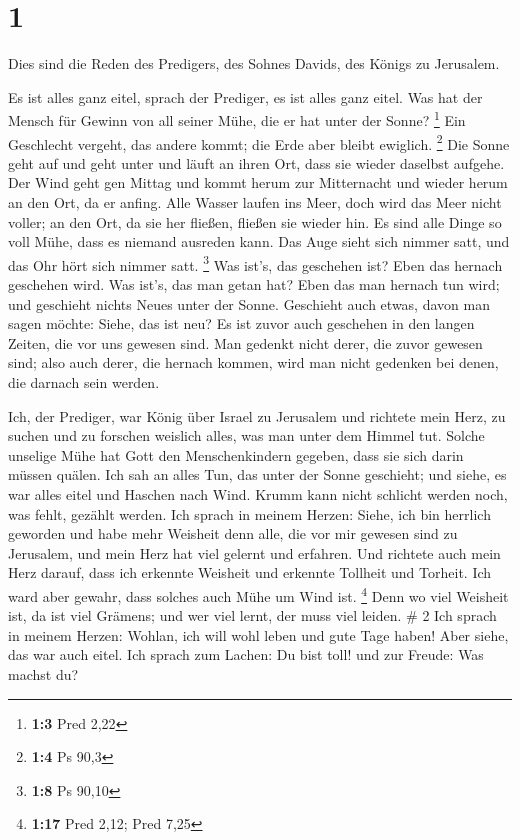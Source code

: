 \hypertarget{section}{%
\section{1}\label{section}}

 Dies sind die Reden des Predigers, des Sohnes Davids, des
Königs zu Jerusalem.

 Es ist alles ganz eitel, sprach der Prediger, es ist
alles ganz eitel.  Was hat der Mensch für Gewinn von all
seiner Mühe, die er hat unter der Sonne? \footnote{\textbf{1:3} Pred
  2,22}  Ein Geschlecht vergeht, das andere kommt; die
Erde aber bleibt ewiglich. \footnote{\textbf{1:4} Ps 90,3}
 Die Sonne geht auf und geht unter und läuft an ihren Ort,
dass sie wieder daselbst aufgehe.  Der Wind geht gen
Mittag und kommt herum zur Mitternacht und wieder herum an den Ort, da
er anfing.  Alle Wasser laufen ins Meer, doch wird das
Meer nicht voller; an den Ort, da sie her fließen, fließen sie wieder
hin.  Es sind alle Dinge so voll Mühe, dass es niemand
ausreden kann. Das Auge sieht sich nimmer satt, und das Ohr hört sich
nimmer satt. \footnote{\textbf{1:8} Ps 90,10}  Was ist's,
das geschehen ist? Eben das hernach geschehen wird. Was ist's, das man
getan hat? Eben das man hernach tun wird; und geschieht nichts Neues
unter der Sonne.  Geschieht auch etwas, davon man sagen
möchte: Siehe, das ist neu? Es ist zuvor auch geschehen in den langen
Zeiten, die vor uns gewesen sind.  Man gedenkt nicht
derer, die zuvor gewesen sind; also auch derer, die hernach kommen, wird
man nicht gedenken bei denen, die darnach sein werden.

 Ich, der Prediger, war König über Israel zu Jerusalem
 und richtete mein Herz, zu suchen und zu forschen
weislich alles, was man unter dem Himmel tut. Solche unselige Mühe hat
Gott den Menschenkindern gegeben, dass sie sich darin müssen quälen.
 Ich sah an alles Tun, das unter der Sonne geschieht; und
siehe, es war alles eitel und Haschen nach Wind.  Krumm
kann nicht schlicht werden noch, was fehlt, gezählt werden.
 Ich sprach in meinem Herzen: Siehe, ich bin herrlich
geworden und habe mehr Weisheit denn alle, die vor mir gewesen sind zu
Jerusalem, und mein Herz hat viel gelernt und erfahren. 
Und richtete auch mein Herz darauf, dass ich erkennte Weisheit und
erkennte Tollheit und Torheit. Ich ward aber gewahr, dass solches auch
Mühe um Wind ist. \footnote{\textbf{1:17} Pred 2,12; Pred 7,25}
 Denn wo viel Weisheit ist, da ist viel Grämens; und wer
viel lernt, der muss viel leiden. \# 2  Ich sprach in
meinem Herzen: Wohlan, ich will wohl leben und gute Tage haben! Aber
siehe, das war auch eitel.  Ich sprach zum Lachen: Du bist
toll! und zur Freude: Was machst du?

